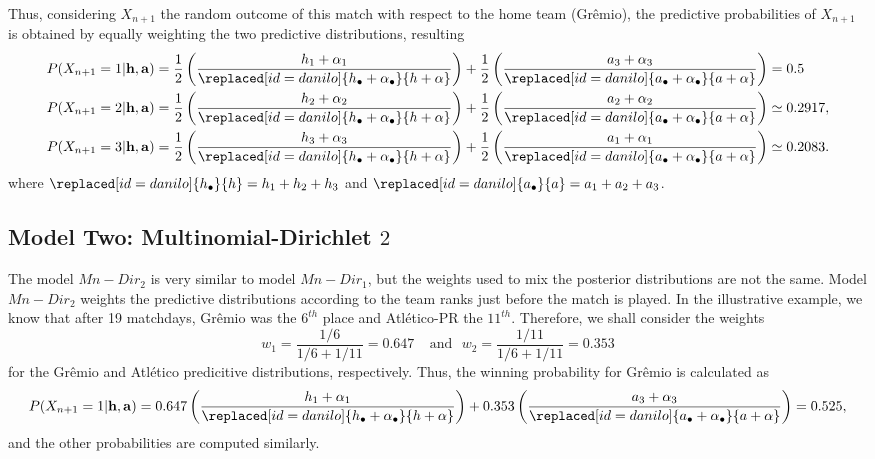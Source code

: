 \documentclass[journal,article,accept,moreauthors,pdftex,12pt,a4paper]{mdpi}
\begin{document}
	Thus, considering $X_{n + 1}$ the random outcome of this match with
	respect to the home team (Gr\^{e}mio), the predictive probabilities
	of $X_{n + 1}$ is obtained by equally weighting the two predictive
	distributions, resulting
	\begin{align*}
	P(X_{n+1}=1|{\bf h}, {\bf a}) &=
	\frac{1}{2}\left(\frac{h_1+\alpha_1}{\replaced[id=danilo]{h_{\bullet}+\alpha_{\bullet}}{h+\alpha}}\right)+\frac{1}{2}\left(\frac{a_3+\alpha_3}{\replaced[id=danilo]{a_{\bullet}+\alpha_{\bullet}}{a+\alpha}}\right)=0.5
	\\
	P(X_{n+1}=2|{\bf h}, {\bf a}) &=
	\frac{1}{2}\left(\frac{h_2+\alpha_2}{\replaced[id=danilo]{h_{\bullet}+\alpha_{\bullet}}{h+\alpha}}\right)+\frac{1}{2}\left(\frac{a_2+\alpha_2}{\replaced[id=danilo]{a_{\bullet}+\alpha_{\bullet}}{a+\alpha}}\right)\simeq0.2917, \\
	P(X_{n+1}=3|{\bf h}, {\bf a}) &= \frac{1}{2}
	\left(\frac{h_3+\alpha_3}{\replaced[id=danilo]{h_{\bullet}+\alpha_{\bullet}}{h+\alpha}}\right)+\frac{1}{2}\left(\frac{a_1+\alpha_1}{\replaced[id=danilo]{a_{\bullet}+\alpha_{\bullet}}{a+\alpha}}\right)\simeq0.2083.
	\end{align*}
	\noindent where $\replaced[id=danilo]{h_{\bullet}}{h}=h_1+h_2+h_3$ and $\replaced[id=danilo]{a_{\bullet}}{a}=a_1+a_2+a_3$.
	
	\subsection{Model Two: Multinomial-Dirichlet $2$}
	\label{sec::Mn_Dir2}
	
	The model $Mn-Dir_2$ is very similar to model $Mn-Dir_1$, but the
	weights used to mix the posterior distributions are not the same.
	Model $Mn-Dir_2$ weights the predictive distributions according to
	the team ranks just before the match is played. In the illustrative
	example, we know that after 19 matchdays, Gr\^emio was the $6^{th}$
	place and Atl\'etico-PR the $11^{th}$. Therefore, we shall consider
	the weights
	\[w_1 = \frac{1/6}{1/6+1/11}=0.647 ~ ~ ~ ~ ~\text{and} ~ ~ ~ w_2 = \frac{1/11}{1/6+1/11}=0.353\]
	\noindent for the Gr\^emio and Atl\'etico predicitive distributions,
	respectively. Thus, the winning probability for Gr\^emio is
	calculated as
	\[P(X_{n+1}= 1|{\bf h}, {\bf a})=0.647\left(\frac{h_1+\alpha_1}{\replaced[id=danilo]{h_{\bullet}+\alpha_{\bullet}}{h+\alpha}}\right)+0.353\left(\frac{a_3+\alpha_3}{\replaced[id=danilo]{a_{\bullet}+\alpha_{\bullet}}{a+\alpha}}\right)=0.525,\]
	\noindent and the other probabilities are computed similarly.
	
\end{document}
